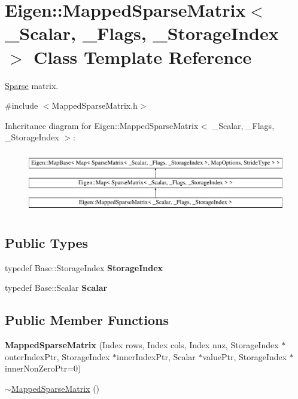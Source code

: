 \hypertarget{class_eigen_1_1_mapped_sparse_matrix}{}\section{Eigen\+::Mapped\+Sparse\+Matrix$<$ \+\_\+\+Scalar, \+\_\+\+Flags, \+\_\+\+Storage\+Index $>$ Class Template Reference}
\label{class_eigen_1_1_mapped_sparse_matrix}


\mbox{\hyperlink{struct_eigen_1_1_sparse}{Sparse}} matrix.  




{\ttfamily \#include $<$Mapped\+Sparse\+Matrix.\+h$>$}

Inheritance diagram for Eigen\+::Mapped\+Sparse\+Matrix$<$ \+\_\+\+Scalar, \+\_\+\+Flags, \+\_\+\+Storage\+Index $>$\+:\begin{figure}[H]
\begin{center}
\leavevmode
\includegraphics[height=2.749591cm]{class_eigen_1_1_mapped_sparse_matrix}
\end{center}
\end{figure}
\subsection*{Public Types}
\begin{DoxyCompactItemize}
\item 
\mbox{\label{class_eigen_1_1_mapped_sparse_matrix_adf73cc50ae4835aa4db56740dffacbc2}} 
typedef Base\+::\+Storage\+Index {\bfseries Storage\+Index}
\item 
\mbox{\label{class_eigen_1_1_mapped_sparse_matrix_a70e97a4e9933f2d92b30a24f0b8fe02a}} 
typedef Base\+::\+Scalar {\bfseries Scalar}
\end{DoxyCompactItemize}
\subsection*{Public Member Functions}
\begin{DoxyCompactItemize}
\item 
\mbox{\label{class_eigen_1_1_mapped_sparse_matrix_a126bf868e2a441dd0d677805c2de1fa8}} 
{\bfseries Mapped\+Sparse\+Matrix} (Index rows, Index cols, Index nnz, Storage\+Index $\ast$outer\+Index\+Ptr, Storage\+Index $\ast$inner\+Index\+Ptr, Scalar $\ast$value\+Ptr, Storage\+Index $\ast$inner\+Non\+Zero\+Ptr=0)
\item 
\mbox{\hyperlink{class_eigen_1_1_mapped_sparse_matrix_a0c36a53853f1659ea59447bcb9a20799}{$\sim$\+Mapped\+Sparse\+Matrix}} ()
\end{DoxyCompactItemize}
